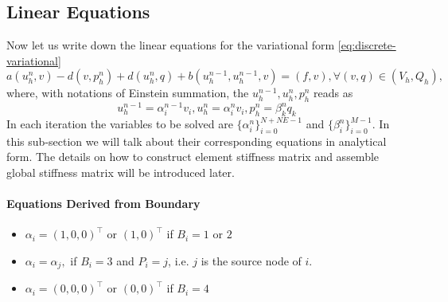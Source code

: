 \subsection{Linear Equations}
Now let us write down the linear equations for the variational form \eqref{eq:discrete-variational}
\[
  a(u_h^n,v)-d(v,p^n_h)+d(u_h^n,q)+b(u_h^{n-1},u_h^{n-1},v)=(f,v),\forall (v,q)\in(V_h,Q_h),
  \]
where, with notations of Einstein summation, the $u_h^{n-1},u_h^n,p_h^n$ reads as
\begin{equation}\label{eq:uf-linear-approximation}
  u_h^{n-1}=\alpha_i^{n-1}v_i,u_h^n=\alpha_i^nv_i,p_h^n=\beta_k^nq_k
\end{equation}
In each iteration the variables to be solved are $\{\alpha_i^n\}_{i=0}^{N+NE-1}$ and $\{\beta_i^n\}_{i=0}^{M-1}$.
In this sub-section we will talk about their corresponding equations in analytical form.
The details on how to construct element stiffness matrix and assemble global stiffness matrix 
will be introduced later.

\paragraph{Equations Derived from Boundary}
\begin{itemize}
  \item $\alpha_i=(1,0,0)^\top \text{ or } (1,0)^\top$ if $B_i=1$ or $2$
  \item $\alpha_i=\alpha_j,$ if $B_i=3$ and $P_i=j$, i.e. $j$ is the source node of $i$.
  \item $\alpha_i=(0,0,0)^\top \text{ or } (0,0)^\top$ if $B_i=4$
\end{itemize}

